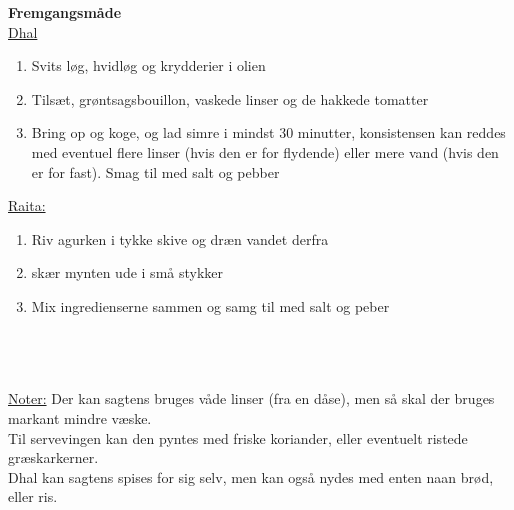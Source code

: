 \documentclass{book}
\begin{document}
\begin{minipage}[t]{0.5\textwidth}
\textbf{Fremgangsmåde} \\
\underline{Dhal} 
\begin{enumerate}
    \item Svits løg, hvidløg og krydderier i olien
    \item Tilsæt, grøntsagsbouillon, vaskede linser og de hakkede tomatter
    \item Bring op og koge, og lad simre i mindst 30 minutter, konsistensen kan reddes med eventuel flere linser (hvis den er for flydende) eller mere vand (hvis den er for fast). Smag til med salt og pebber
\end{enumerate}
\underline{Raita:}
\begin{enumerate}
    \item Riv agurken i tykke skive og dræn vandet derfra
    \item skær mynten ude i små stykker
    \item Mix ingredienserne sammen og samg til med salt og peber
\end{enumerate}
\end{minipage}
\\ \\ \\ \underline{Noter:}
Der kan sagtens bruges våde linser (fra en dåse), men så skal der bruges markant mindre væske. \\ Til servevingen kan den pyntes med friske koriander, eller eventuelt ristede græskarkerner.  \\ Dhal kan sagtens spises for sig selv, men kan også nydes med enten naan brød, eller ris.
\end{document}
